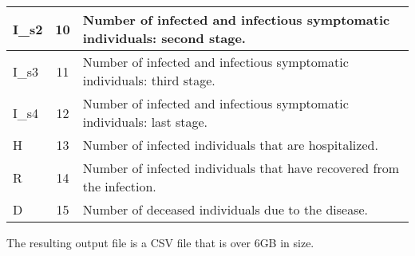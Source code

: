 \begin{table}[htbp]
{\begin{tabular}{|l|c|p{9.25cm}|}
            \hline
            I\_s2       & 10               & Number of infected and infectious symptomatic individuals: second stage.                                    \\
            \hline
            I\_s3       & 11               & Number of infected and infectious symptomatic individuals: third stage.                                     \\
            \hline
            I\_s4       & 12               & Number of infected and infectious symptomatic individuals: last stage.                                      \\
            \hline
            H           & 13               & Number of infected individuals that are hospitalized.                                                       \\
            \hline
            R           & 14               & Number of infected individuals that have recovered from the infection.                                      \\
            \hline
            D           & 15               & Number of deceased individuals due to the disease.                                                          \\
            \hline
        \end{tabular}%
    }
\end{table}

\begin{table}[htbp]
    \centering
    \caption{Description of output parameters.}
    \label{tab:outparams}
\end{table}

The resulting output file is a CSV file that is over 6GB in size.
